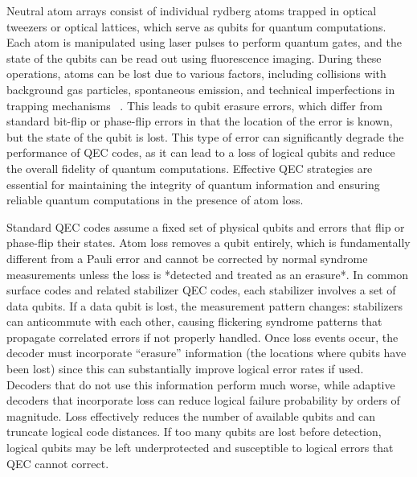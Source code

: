 \documentclass[aps,prb,twocolumn,superscriptaddress,nobibnotes]{revtex4-2} %
\begin{document}
Neutral atom arrays consist of individual rydberg atoms trapped in optical tweezers or optical lattices, which serve as qubits for quantum computations.
Each atom is manipulated using laser pulses to perform quantum gates, and the state of the qubits can be read out using fluorescence imaging.
During these operations, atoms can be lost due to various factors, including collisions with background gas particles, spontaneous emission, and technical imperfections in trapping mechanisms ~\cite{Bluvstein2024}.
This leads to qubit erasure errors, which differ from standard bit-flip or phase-flip errors in that the location of the error is known, but the state of the qubit is lost.
This type of error can significantly degrade the performance of QEC codes, as it can lead to a loss of logical qubits and reduce the overall fidelity of quantum computations.
Effective QEC strategies are essential for maintaining the integrity of quantum information and ensuring reliable quantum computations in the presence of atom loss.

Standard QEC codes assume a fixed set of physical qubits and errors that flip or phase-flip their states. 
Atom loss removes a qubit entirely, which is fundamentally different from a Pauli error and cannot be corrected by normal syndrome measurements unless the loss is *detected and treated as an erasure*. \cite{PMC}
In common surface codes and related stabilizer QEC codes, each stabilizer involves a set of data qubits. 
If a data qubit is lost, the measurement pattern changes: stabilizers can anticommute with each other, causing flickering syndrome patterns that propagate correlated errors if not properly handled. \cite{Nature}
Once loss events occur, the decoder must incorporate “erasure” information (the locations where qubits have been lost) since this can substantially improve logical error rates if used. 
Decoders that do not use this information perform much worse, while adaptive decoders that incorporate loss can reduce logical failure probability by orders of magnitude. \cite{EmergentMind}
Loss effectively reduces the number of available qubits and can truncate logical code distances. 
If too many qubits are lost before detection, logical qubits may be left underprotected and susceptible to logical errors that QEC cannot correct.
\end{document}
